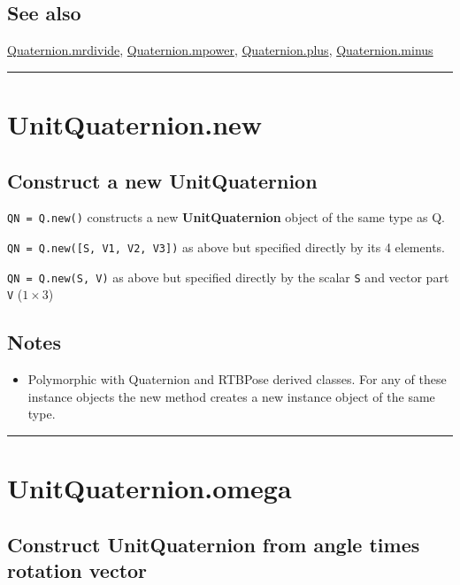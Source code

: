 \subsection*{See also}


\hyperlink{Quaternion.mrdivide}{\color{blue} Quaternion.mrdivide}, \hyperlink{Quaternion.mpower}{\color{blue} Quaternion.mpower}, \hyperlink{Quaternion.plus}{\color{blue} Quaternion.plus}, \hyperlink{Quaternion.minus}{\color{blue} Quaternion.minus}

\vspace{1.5ex}\hrule

\hypertarget{UnitQuaternion.new}{\section*{UnitQuaternion.new}}
\subsection*{Construct a new UnitQuaternion}


\texttt{QN = Q.new()} constructs a new \textbf{\color{red} UnitQuaternion} object of the same type as Q.



\texttt{QN = Q.new([S, V1, V2, V3])} as above but specified directly by its 4 elements.



\texttt{QN = Q.new(S, V)} as above but specified directly by the scalar \texttt{S} and vector
part \texttt{V} ($1 \times 3$)


\subsection*{Notes}
\begin{itemize}
  \item Polymorphic with Quaternion and RTBPose derived classes.  For any of these    instance objects the new method creates a new instance object of the same type.
\end{itemize}
\vspace{1.5ex}\hrule

\hypertarget{UnitQuaternion.omega}{\section*{UnitQuaternion.omega}}
\subsection*{Construct UnitQuaternion from angle times rotation vector}


